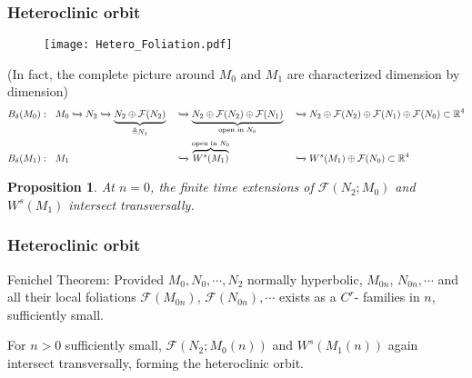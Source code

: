 \documentclass{beamer}
\def\blue{\color{blue}}
\newtheorem{proposition}{Proposition}
\begin{document}
\begin{frame}
\frametitle{Heteroclinic orbit}
 \begin{figure}
  \texttt{[image: Hetero\_Foliation.pdf]}
 \end{figure}
{ \tiny
(In fact, the complete picture around $M_0$ and $M_1$ are characterized dimension by dimension)
\begin{align*}
 B_\delta(M_0): ~~ M_0&\xhookrightarrow{} N_2\xhookrightarrow{} \underbrace{N_2\oplus \mathcal{F}(N_2)}_{\triangleq N_1} &&\xhookrightarrow{} \underbrace{N_2\oplus \mathcal{F}(N_2)\oplus \mathcal{F}(N_1)}_{\text{open in } N_0} &&\xhookrightarrow{} N_2\oplus \mathcal{F}(N_2)\oplus \mathcal{F}(N_1) \oplus \mathcal{F}(N_0)\subset \mathbb{R}^4\\
 B_\delta(M_1): ~~ M_1& & &\xhookrightarrow{} \overbrace{W^s(M_1)}^{\text{open in } N_0}&&\xhookrightarrow{} W^s(M_1)\oplus \mathcal{F}(N_0)\subset \mathbb{R}^4
\end{align*}
}

\begin{proposition}
 At $n=0$, the finite time extensions of $\mathcal{F}(N_2;M_0)$ and $W^{s}(M_1)$ intersect transversally.
\end{proposition} 
 
\end{frame}


\begin{frame}
 \frametitle{Heteroclinic orbit}
{\scriptsize 
 Fenichel Theorem: Provided $M_0, N_0, \cdots , N_2$ {\blue normally hyperbolic}, $M_{0n}$, $N_{0n}, \cdots$ and all their local foliations $\mathcal{F}(M_{0n})$, $\mathcal{F}(N_{0n}), \cdots$ {\blue exists} as a $C^r$- families in $n$, sufficiently small.
} 

\begin{corollary}
 For $n>0$ sufficiently small, $\mathcal{F}(N_2;M_0(n))$ and $W^{s}(M_1(n))$ again intersect transversally, forming the heteroclinic orbit.
\end{corollary}

\end{frame}
\end{document}
